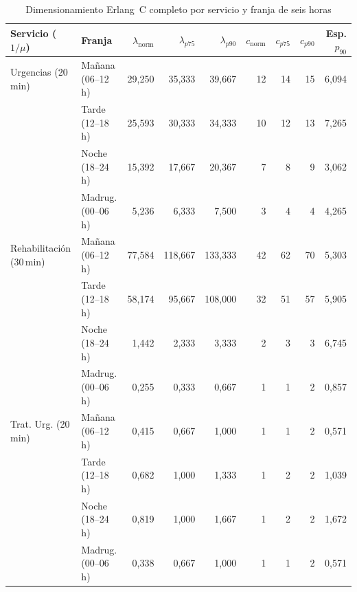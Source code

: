 \begin{table}[htbp]
\caption{Dimensionamiento Erlang~C completo por servicio y franja de seis horas}
\label{tab:anexo_erlang_12}
{\singlespacing\footnotesize
\begin{tabularx}{\textwidth}{@{}L{0.20\textwidth} Y r r r r r r r@{}}
\toprule
Servicio ($1/\mu$) & Franja & $\lambda_{\text{norm}}$ & $\lambda_{p75}$ & $\lambda_{p90}$ & $c_{\text{norm}}$ & $c_{p75}$ & $c_{p90}$ & Esp. $p_{90}$ \\
\midrule
Urgencias (20\,min) & Mañana (06--12\,h) & 29,250 & 35,333 & 39,667 & 12 & 14 & 15 & 6,094 \\
 & Tarde (12--18\,h) & 25,593 & 30,333 & 34,333 & 10 & 12 & 13 & 7,265 \\
 & Noche (18--24\,h) & 15,392 & 17,667 & 20,367 & 7 & 8 & 9 & 3,062 \\
 & Madrug. (00--06\,h) & 5,236 & 6,333 & 7,500 & 3 & 4 & 4 & 4,265 \\
\midrule
Rehabilitación (30\,min) & Mañana (06--12\,h) & 77,584 & 118,667 & 133,333 & 42 & 62 & 70 & 5,303 \\
 & Tarde (12--18\,h) & 58,174 & 95,667 & 108,000 & 32 & 51 & 57 & 5,905 \\
 & Noche (18--24\,h) & 1,442 & 2,333 & 3,333 & 2 & 3 & 3 & 6,745 \\
 & Madrug. (00--06\,h) & 0,255 & 0,333 & 0,667 & 1 & 1 & 2 & 0,857 \\
\midrule
Trat. Urg. (20\,min) & Mañana (06--12\,h) & 0,415 & 0,667 & 1,000 & 1 & 1 & 2 & 0,571 \\
 & Tarde (12--18\,h) & 0,682 & 1,000 & 1,333 & 1 & 2 & 2 & 1,039 \\
 & Noche (18--24\,h) & 0,819 & 1,000 & 1,667 & 1 & 2 & 2 & 1,672 \\
 & Madrug. (00--06\,h) & 0,338 & 0,667 & 1,000 & 1 & 1 & 2 & 0,571 \\
\bottomrule
\end{tabularx}}
\end{table}

